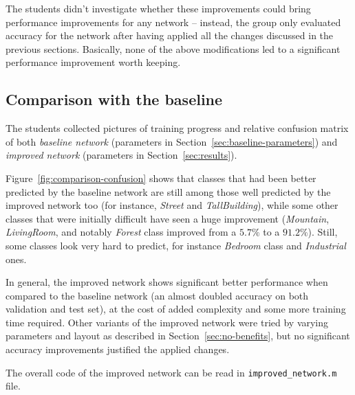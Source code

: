 \documentclass[a4paper, 11pt]{article} %
\begin{document}
The students didn't investigate whether these improvements could bring performance improvements for any network \--- instead, the group only evaluated accuracy for the network after having applied all the changes discussed in the previous sections. Basically, none of the above modifications led to a significant performance improvement worth keeping.

\subsection{Comparison with the baseline}\label{sec:baseline-comparison}

The students collected pictures of training progress and relative confusion matrix of both \emph{baseline network} (parameters in Section~\ref{sec:baseline-parameters}) and \emph{improved network} (parameters in Section~\ref{sec:results}).

Figure~\ref{fig:comparison-confusion} shows that classes that had been better predicted by the baseline network are still among those well predicted by the improved network too (for instance, \emph{Street} and \emph{TallBuilding}), while some other classes that were initially difficult have seen a huge improvement (\emph{Mountain}, \emph{LivingRoom}, and notably \emph{Forest} class improved from a $5.7\%$ to a $91.2\%$). Still, some classes look very hard to predict, for instance \emph{Bedroom} class and \emph{Industrial} ones.

In general, the improved network shows significant better performance when compared to the baseline network (an almost doubled accuracy on both validation and test set), at the cost of added complexity and some more training time required. Other variants of the improved network were tried by varying parameters and layout as described in Section~\ref{sec:no-benefits}, but no significant accuracy improvements justified the applied changes.

The overall code of the improved network can be read in \texttt{improved\_network.m} file.
\end{document}
